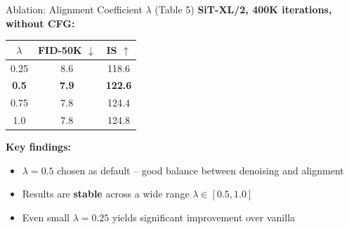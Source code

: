 \documentclass[aspectratio=169, 10pt]{beamer}
\begin{document}
\begin{frame}{Ablation: Alignment Coefficient $\lambda$ (Table 5)}
\small
\textbf{SiT-XL/2, 400K iterations, without CFG:}

\vspace{0.5em}
\begin{center}
\begin{tabular}{ccc}
\toprule
\textbf{$\lambda$} & \textbf{FID-50K $\downarrow$} & \textbf{IS $\uparrow$} \\
\midrule
0.25 & 8.6 & 118.6 \\
\textbf{0.5}  & \textbf{7.9} & \textbf{122.6} \\
0.75 & 7.8 & 124.4 \\
1.0  & 7.8 & 124.8 \\
\bottomrule
\end{tabular}
\end{center}

\vspace{0.6em}
\textbf{Key findings:}
\begin{itemize}\setlength{\itemsep}{2pt}
  \item $\lambda = 0.5$ chosen as default -- good balance between denoising and alignment
  \item Results are \textbf{stable} across a wide range $\lambda \in [0.5, 1.0]$
  \item Even small $\lambda = 0.25$ yields significant improvement over vanilla
\end{itemize}
\end{frame}
\end{document}
